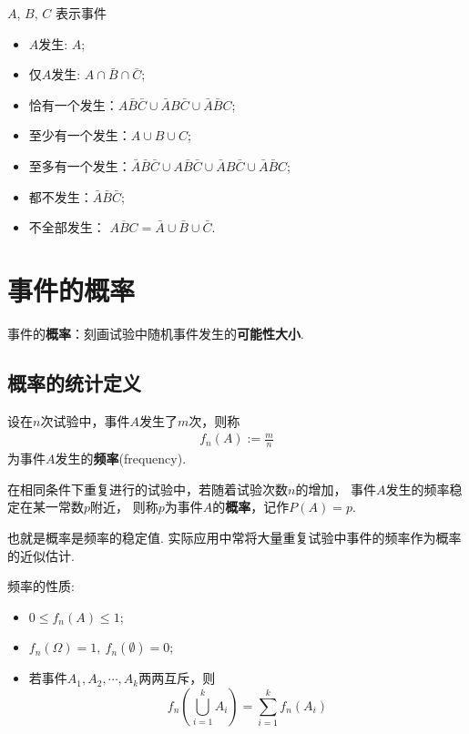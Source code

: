 \begin{example}
    $A$, $B$, $C$ 表示事件
    \begin{itemize}
        \item $A$发生: $A$; 
        \item 仅$A$发生: $A\cap \bar{B}\cap \bar{C}$; 
        \item 恰有一个发生：$A \bar B \bar C\cup \bar AB\bar C\cup \bar A\bar BC$;
        \item 至少有一个发生：$A\cup B\cup C$;
        \item 至多有一个发生：$\bar A\bar B\bar C\cup A \bar B \bar C \cup \bar AB\bar C\cup \bar A\bar BC$;
        \item 都不发生：$\bar A\bar B\bar C$;
        \item 不全部发生： $\overline{ABC}=\bar A\cup \bar B\cup \bar C$.
    \end{itemize}
\end{example}

\section{事件的概率}

事件的\textbf{概率}：刻画试验中随机事件发生的\textbf{可能性大小}. 

\subsection{概率的统计定义}
\begin{definition}
    设在$n$次试验中，事件$A$发生了$m$次，则称
    \begin{align*}
        f_n(A):=\frac{m}{n}
    \end{align*}
    为事件$A$发生的\textbf{频率}(frequency). 
\end{definition}

\begin{definition*}%
    在相同条件下重复进行的试验中，若随着试验次数$n$的增加，
    事件$A$发生的频率稳定在某一常数$p$附近，
    则称$p$为事件$A$的\textbf{概率}，记作$P(A)=p$. 
\end{definition*}
也就是概率是频率的稳定值. 实际应用中常将大量重复试验中事件的频率作为概率的近似估计. 

\begin{proposition*}
    频率的性质: 
    \begin{itemize}
        \item $0\le f_n(A)\le 1$; 
        \item $f_n(\Omega)=1,\ f_n(\emptyset)=0$; 
        \item 若事件$A_1, A_2, \cdots, A_k$两两互斥，则
              $$f_n \left( \bigcup_{i=1}^k A_i \right)=\sum_{i=1}^k f_n(A_i)$$
    \end{itemize}
\end{proposition*}

